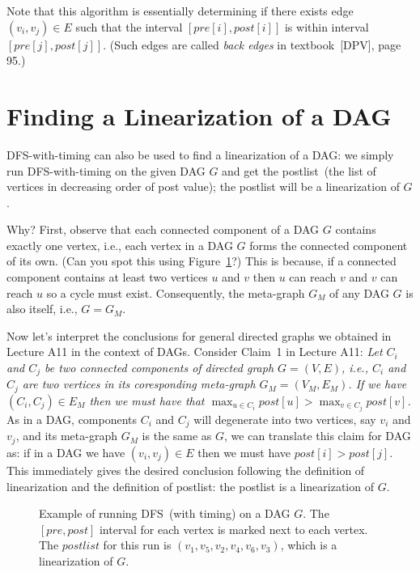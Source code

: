 Note that this algorithm is essentially determining if there exists edge $(v_i, v_j) \in E$
such that the interval $[pre[i], post[i]]$ is within interval $[pre[j], post[j]]$.
(Such edges are called \emph{back edges} in textbook~[DPV], page 95.)


\section*{Finding a Linearization of a DAG}

DFS-with-timing can also be used to find a linearization of a DAG: we simply run DFS-with-timing on the given DAG $G$
and get the postlist~(the list of vertices in decreasing order of post value); the postlist will be a linearization of $G$.

Why? First, observe that each connected component of a DAG $G$ contains exactly one vertex, i.e., each vertex in a DAG $G$
forms the connected component of its own. (Can you spot this using Figure~\ref{fig:meta-graph}?)
This is because, if a connected component contains at least two vertices $u$ and $v$ then $u$ can reach $v$ and $v$ can reach $u$ so a cycle must exist.
Consequently, the meta-graph $G_M$ of any DAG $G$ is also itself, i.e., $G= G_M$. %

Now let's interpret the conclusions for general directed graphs we obtained in  Lecture A11 in the context of DAGs.
Consider Claim~1 in Lecture A11: \emph{Let $C_i$ and $C_j$ be two connected components of directed graph $G = (V, E)$, i.e., $C_i$ and $C_j$ are two
vertices in its coresponding meta-graph $G_M = (V_M, E_M)$. If we have $(C_i, C_j) \in E_M$ then
we must have that $\max_{u\in C_i} post[u] > \max_{v\in C_j} post[v]$.}
As in a DAG, components $C_i$ and $C_j$ will degenerate into two vertices, say $v_i$ and $v_j$, and
its meta-graph $G_M$ is the same as $G$, we can translate this claim for DAG as: 
if in a DAG we have $(v_i, v_j) \in E$ then we must have $post[i] > post[j]$.
This immediately gives the desired conclusion following the definition of linearization
and the definition of postlist: the postlist is a linearization of $G$.

\begin{figure}[h!]
\centering{}
\caption{Example of running DFS~(with timing) on a DAG $G$. The $[pre,post]$ interval for each vertex
is marked next to each vertex. The $postlist$ for this run is $(v_1, v_5, v_2, v_4, v_6, v_3)$, which is a linearization of $G$.}
\label{fig:meta-graph}
\end{figure}


